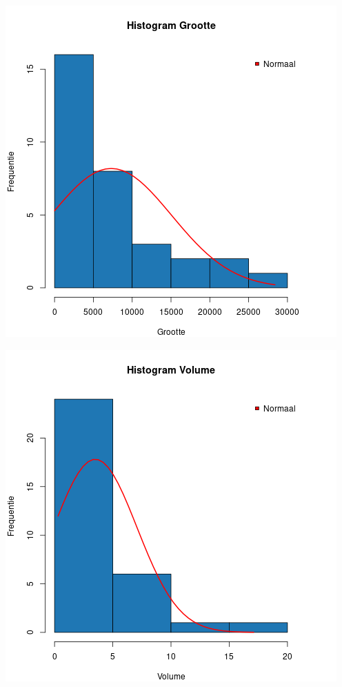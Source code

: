 \documentclass[12pt]{article}
\begin{document}
\noindent\begin{minipage}{0.5\linewidth}
    \centering
    \includegraphics[width=\linewidth]{vragen/vraag1/images/hist_norm_grootte.png}
    \label{fig:hist_norm_grootte}
\end{minipage}
\noindent\begin{minipage}{0.5\linewidth}
    \centering
    \includegraphics[width=\linewidth]{vragen/vraag1/images/hist_norm_volume.png}
    \label{fig:hist_norm_volume}
\end{minipage}
\end{document}
